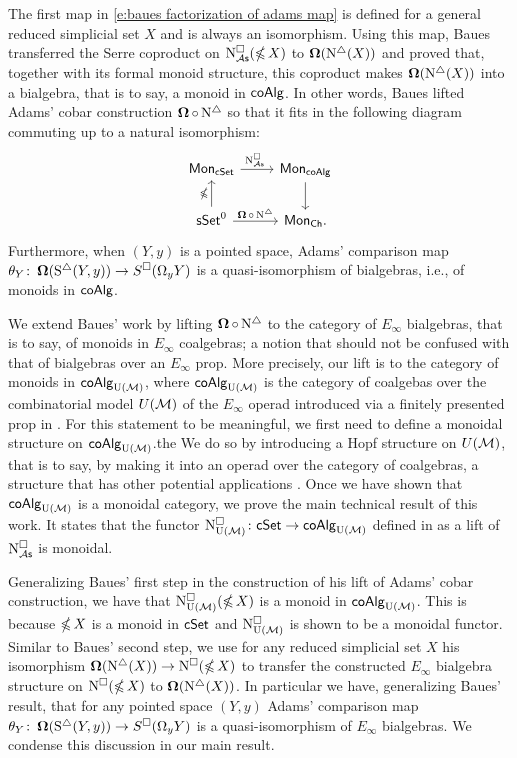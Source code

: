 The first map in \eqref{e:baues factorization of adams map} is defined for a general reduced simplicial set $X$ and is always an isomorphism.
Using this map, Baues transferred the Serre coproduct on $\operatorname{N^{\square}_{\mathcal{A}\mathsf{s}}}(\operatorname{\mathbb{\Omega}} X)$ to $\operatorname{\mathbf{\Omega}}(\operatorname{N^{\triangle}}(X))$ and proved that, together with its formal monoid structure, this coproduct makes $\operatorname{\mathbf{\Omega}}(\operatorname{N^{\triangle}}(X))$ into a bialgebra, that is to say, a monoid in $\mathsf{coAlg}$.
In other words, Baues lifted Adams' cobar construction $\operatorname{\mathbf{\Omega}} \circ \operatorname{N^{\triangle}}$ so that it fits in the following diagram commuting up to a natural isomorphism:
\begin{equation*}
\begin{tikzcd}
\Mon_{\cSet} \arrow[r, "\cchainsAS \ "] & \Mon_{\coAlg} \arrow[d] \\
\sSet^0 \arrow[r, "\cobar \circ \schains"] \arrow[u, "\gcobar"] & \Mon_{\Ch}.
\end{tikzcd}
\end{equation*}
Furthermore, when $(Y, y)$ is a pointed space, Adams' comparison map $\theta_Y \colon \operatorname{\mathbf{\Omega}}(\operatorname{S^{\triangle}}(Y, y)) \to S^{\square}(\Omega_y Y)$ is a quasi-isomorphism of bialgebras, i.e., of monoids in $\mathsf{coAlg}$.

We extend Baues' work by lifting $\operatorname{\mathbf{\Omega}} \circ \operatorname{N^{\triangle}}$ to the category of $E_\infty$ bialgebras, that is to say, of monoids in $E_\infty$ coalgebras; a notion that should not be confused with that of bialgebras over an $E_\infty$ prop.
More precisely, our lift is to the category of monoids in $\mathsf{coAlg}_{\mathrm{U}(\mathcal{M})}$, where $\mathsf{coAlg}_{\mathrm{U}(\mathcal{M})}$ is the category of coalgebas over the combinatorial model $U(\mathcal{M})$ of the $E_\infty$ operad introduced via a finitely presented prop in \cite{medina2020prop1}.
For this statement to be meaningful, we first need to define a monoidal structure on $\mathsf{coAlg}_{\mathrm{U}(\mathcal{M})}$.the
We do so by introducing a Hopf structure on $U(\mathcal{M})$, that is to say, by making it into an operad over the category of coalgebras, a structure that has other potential applications \cite{livernet2008hopf}.
Once we have shown that $\mathsf{coAlg}_{\mathrm{U}(\mathcal{M})}$ is a monoidal category, we prove the main technical result of this work.
It states that the functor $\operatorname{N^{\square}_{{\mathrm{U}(\mathcal{M})}}} \colon \mathsf{cSet} \to \mathsf{coAlg}_{\mathrm{U}(\mathcal{M})}$ defined in \cite{medina2021cubical} as a lift of $\operatorname{N^{\square}_{\mathcal{A}\mathsf{s}}}$ is monoidal.

Generalizing Baues' first step in the construction of his lift of Adams' cobar construction, we have that $\operatorname{N^{\square}_{{\mathrm{U}(\mathcal{M})}}}(\operatorname{\mathbb{\Omega}} X)$ is a monoid in $\mathsf{coAlg}_{\mathrm{U}(\mathcal{M})}$.
This is because $\operatorname{\mathbb{\Omega}} X$ is a monoid in $\mathsf{cSet}$ and $\operatorname{N^{\square}_{{\mathrm{U}(\mathcal{M})}}}$ is shown to be a monoidal functor.
Similar to Baues' second step, we use for any reduced simplicial set $X$ his isomorphism $\operatorname{\mathbf{\Omega}}(\operatorname{N^{\triangle}}(X)) \to \operatorname{N^{\square}}(\operatorname{\mathbb{\Omega}} X)$ to transfer the constructed $E_\infty$ bialgebra structure on $\operatorname{N^{\square}}(\operatorname{\mathbb{\Omega}} X)$ to $\operatorname{\mathbf{\Omega}}(\operatorname{N^{\triangle}}(X))$.
In particular we have, generalizing Baues' result, that for any pointed space $(Y, y)$ Adams' comparison map $\theta_Y \colon \operatorname{\mathbf{\Omega}}(\operatorname{S^{\triangle}}(Y, y)) \to S^{\square}(\Omega_y Y)$ is a quasi-isomorphism of $E_\infty$ bialgebras.
We condense this discussion in our main result.

